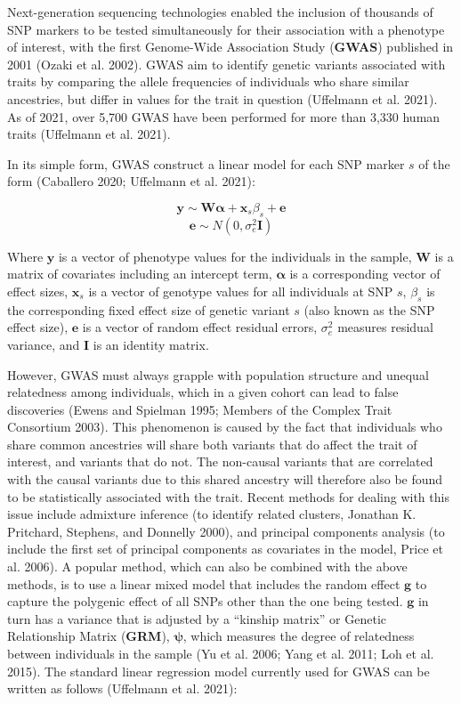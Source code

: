 \documentclass[
]{book}
\begin{document}
Next-generation sequencing technologies enabled the inclusion of thousands of SNP markers to be tested simultaneously for their association with a phenotype of interest, with the first Genome-Wide Association Study (\textbf{GWAS}) published in 2001 (Ozaki et al. 2002). GWAS aim to identify genetic variants associated with traits by comparing the allele frequencies of individuals who share similar ancestries, but differ in values for the trait in question (Uffelmann et al. 2021). As of 2021, over 5,700 GWAS have been performed for more than 3,330 human traits (Uffelmann et al. 2021).

In its simple form, GWAS construct a linear model for each SNP marker \(s\) of the form (Caballero 2020; Uffelmann et al. 2021):

\begin{equation}
\pmb{y} \sim \pmb{W} \pmb{\alpha} + \pmb{x}_s\beta_s + \pmb{e}  \label{eq:gwassimp}
\end{equation}
\begin{equation}
\pmb{e} \sim N(0,\sigma^2_e \pmb{I}) \label{eq:gwassimpe}
\end{equation}

Where \(\pmb{y}\) is a vector of phenotype values for the individuals in the sample, \(\pmb{W}\) is a matrix of covariates including an intercept term, \(\pmb{\alpha}\) is a corresponding vector of effect sizes, \(\pmb{x}_s\) is a vector of genotype values for all individuals at SNP \(s\), \(\beta_s\) is the corresponding fixed effect size of genetic variant \(s\) (also known as the SNP effect size), \(\pmb{e}\) is a vector of random effect residual errors, \(\sigma^2_e\) measures residual variance, and \(\pmb{I}\) is an identity matrix.

However, GWAS must always grapple with population structure and unequal relatedness among individuals, which in a given cohort can lead to false discoveries (Ewens and Spielman 1995; Members of the Complex Trait Consortium 2003). This phenomenon is caused by the fact that individuals who share common ancestries will share both variants that do affect the trait of interest, and variants that do not. The non-causal variants that are correlated with the causal variants due to this shared ancestry will therefore also be found to be statistically associated with the trait. Recent methods for dealing with this issue include admixture inference (to identify related clusters, Jonathan K. Pritchard, Stephens, and Donnelly 2000), and principal components analysis (to include the first set of principal components as covariates in the model, Price et al. 2006). A popular method, which can also be combined with the above methods, is to use a linear mixed model that includes the random effect \(\pmb{g}\) to capture the polygenic effect of all SNPs other than the one being tested. \(\pmb{g}\) in turn has a variance that is adjusted by a ``kinship matrix'' or Genetic Relationship Matrix (\textbf{GRM}), \(\pmb{\psi}\), which measures the degree of relatedness between individuals in the sample (Yu et al. 2006; Yang et al. 2011; Loh et al. 2015). The standard linear regression model currently used for GWAS can be written as follows (Uffelmann et al. 2021):
\end{document}
